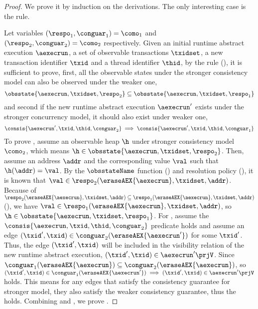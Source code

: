 \begin{proof}
We prove it by induction on the derivations.
The only interesting case is the  rule.


Let variables \( (\respo_{1}, \conguar_{1}) = \como_{1} \) and  \( (\respo_{2}, \conguar_{2}) = \como_{2} \) respectively.
Given an initial runtime abstract execution \( \aexecrun \), a set of observable transactions \( \txidset \), a new transaction identifier \( \txid \) and a thread identifier \( \thid \), by the  rule (), it is sufficient to prove, first, all the observable states under the stronger consistency model can also be observed under the weaker one,
\begin{equation}
    \label{equ:obs-state-included}
    \obsstate{\aexecrun, \txidset, \respo_{2}} \subseteq  \obsstate{\aexecrun, \txidset, \respo_{1}} 
\end{equation}
and second if the new runtime abstract execution \( \aexecrun' \) exists under the stronger concurrency model, it should also exist under weaker one,
\begin{equation}
    \label{equ:consis-both-exist}
    \consis{\aexecrun', \txid, \thid, \conguar_{2}} \implies \consis{\aexecrun', \txid, \thid, \conguar_{1}}
\end{equation}
To prove , assume an observable heap \( \h \) under stronger consistency model \( \como_{2}\), which means \( \h \in \obsstate{\aexecrun, \txidset, \respo_{2}} \).
Then, assume an address \( \addr\) and the corresponding value \( \val \) such that \(  \h(\addr) = \val \).
By the \( \obsstateName \) function  () and resolution policy (), it is known that \( \val \in \respo_{2}(\eraseAEX{\aexecrun}, \txidset, \addr)  \).
Because of \( \respo_{2}(\eraseAEX{\aexecrun}, \txidset, \addr) \subseteq \respo_{1}(\eraseAEX{\aexecrun}, \txidset, \addr) \) (), we have \(  \val \in \respo_{1}(\eraseAEX{\aexecrun}, \txidset, \addr) \), so \( \h \in \obsstate{\aexecrun, \txidset, \respo_{1}} \).
For , assume the \( \consis{\aexecrun, \txid, \thid, \conguar_{2}} \) predicate holds and assume an edge \( (\txid', \txid) \in \conguar_{2}(\eraseAEX{\aexecrun'}) \) for some \( \txid' \).
Thus, the edge \( (\txid', \txid) \) will be included in the visibility relation of the new runtime abstract execution, \ie \( (\txid', \txid) \in \aexecrun'\prjV \).
Since \( \conguar_{1}(\eraseAEX{\aexecrun}) \subseteq \conguar_{2}(\eraseAEX{\aexecrun})\), so \( (\txid', \txid) \in \conguar_{1}(\eraseAEX{\aexecrun'}) \implies (\txid', \txid) \in \aexecrun'\prjV \) holds.
This means for any edges that satisfy the consistency guarantee for stronger model, they also satisfy the weaker consistency guarantee, thus the  holds.
Combining  and , we prove .


\end{proof}
